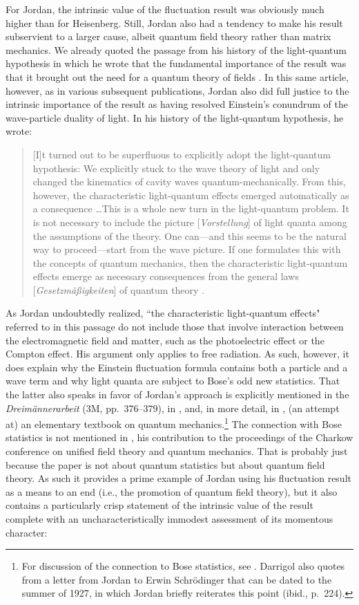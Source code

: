 \documentclass{elsart}
\begin{document}
For Jordan, the intrinsic value of the fluctuation result was obviously much higher than for Heisenberg. Still, Jordan also had a tendency to make his result subservient to a larger cause, albeit quantum field theory rather than matrix mechanics. We already quoted the passage from his history of the light-quantum hypothesis in which he wrote that the fundamental importance of the result was that it brought out the need for a quantum theory of fields \citep[pp.\ 195--196]{Jordan 1928}. In this same article, however, as in various subsequent publications, Jordan also did full justice to the intrinsic importance of the result as having resolved Einstein's conundrum of the wave-particle duality of light. In his history of the light-quantum hypothesis, he wrote: 
\begin{quotation}
[I]t turned out to be superfluous to explicitly adopt the light-quantum hypothesis: We explicitly stuck to the wave theory of light and only changed the kinematics of cavity waves quantum-mechanically. From this, however, the characteristic light-quantum effects emerged automatically as a consequence \ldots This is a whole new turn in the light-quantum problem. It is not necessary to include the picture [{\it Vorstellung}] of light quanta among the assumptions of the theory. One can---and this seems to be the natural way to proceed---start from the wave picture. If one formulates this with the concepts of quantum mechanics, then the characteristic light-quantum effects emerge as necessary consequences from the general laws [{\it Gesetzm\"a\ss igkeiten}] of quantum theory \citep[p.\ 195]{Jordan 1928}.
\end{quotation}
As Jordan undoubtedly realized, ``the characteristic light-quantum effects" referred to in this passage do not include those that involve interaction between the electromagnetic field and matter, such as the photoelectric effect or the Compton effect. His argument only applies to free radiation. As such, however, it does explain why the Einstein fluctuation formula contains both a particle and a wave term and why light quanta are subject to Bose's odd new statistics. That the latter also speaks in favor of Jordan's approach is explicitly mentioned in the {\it Dreim\"annerarbeit} (3M, pp.\ 376--379), in \citep[p.\ 182]{Jordan 1928}, and, in more detail, in \citep[p.\ 220]{Jordan 1936}, (an attempt at) an elementary textbook on quantum mechanics.\footnote{For discussion of the connection to Bose statistics, see \citep[p.\ 221]{Darrigol 1986}. Darrigol also quotes from a letter from Jordan to Erwin Schr\"odinger that can be dated to the summer of 1927, in which Jordan briefly reiterates this point (ibid., p.\ 224).} The connection with Bose statistics is not mentioned in \citep{Jordan 1929}, his contribution to the proceedings of the Charkow conference on unified field theory and quantum mechanics. That is probably just because the paper is not about quantum statistics but about quantum field theory. As such it provides a prime example of Jordan using his fluctuation result as a means to an end (i.e., the promotion of quantum field theory), but it also contains a particularly crisp statement of the intrinsic value of the result complete with an uncharacteristically immodest  assessment of its momentous character: 
\end{document}
